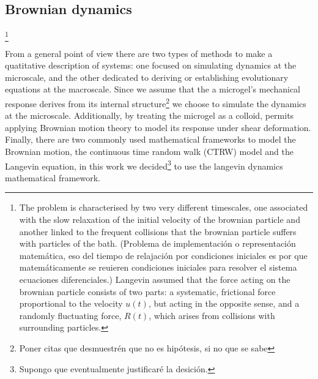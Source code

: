 \documentclass[../../main-notes.tex]{subfiles}
\begin{document}
\subsection{Brownian dynamics}\footnote{ 
The problem is characterised by two very different timescales, one associated with the slow relaxation of the initial velocity of the brownian particle and another linked to the frequent collisions that the brownian particle suffers with particles of the bath. (Problema de implementación o representación matemática, eso del tiempo de relajación por condiciones iniciales es por que matemáticamente se reuieren condiciones iniciales para resolver el sistema ecuaciones diferenciales.) 
Langevin assumed that the force acting on the brownian particle consists of two parts: a systematic, frictional force proportional to the velocity $u(t)$, but acting in the opposite sense, and a randomly fluctuating force, $R(t)$, which arises from collisions with surrounding particles\citep{tsl2006}.
}


From a general point of view there are two types of methods to make a quatitative description of systems: one focused on simulating dynamics at the microscale, and the other dedicated to deriving or establishing evolutionary equations at the macroscale\citep{wangMultiscaleModelingSimulation2025}.
Since we assume that the a microgel's mechanical response derives from its internal structure\footnote{Poner citas que desmuestrén que no es hipótesis, si no que se sabe} we choose to simulate the dynamics at the microscale.
Additionally, by treating the microgel as a colloid, permits applying Brownian motion theory to model its response under shear deformation. 
Finally, there are two commonly used mathematical frameworks to model the Brownian motion, the continuous time random walk (CTRW) model and the Langevin equation\citep{wangMultiscaleModelingSimulation2025}, in this work we decided\footnote{Supongo que eventualmente justificaré la desición.} to use the langevin dynamics mathematical framework.
\end{document}
